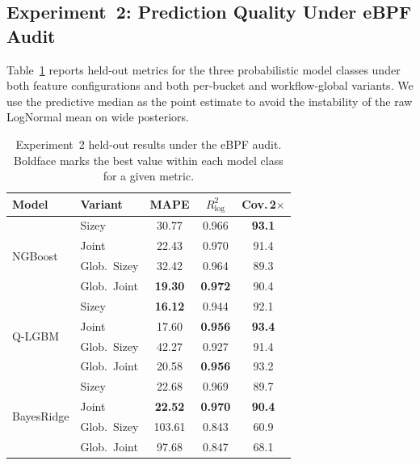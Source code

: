 \subsection{Experiment~2: Prediction Quality Under eBPF Audit}
\label{sec:exp2}

Table~\ref{tab:exp2-final} reports held-out metrics for the
three probabilistic model classes under both feature
configurations and both per-bucket and workflow-global
variants. We use the predictive median as the point estimate
to avoid the instability of the raw LogNormal mean on wide
posteriors.

\begin{table}[t]
\centering
\caption{Experiment~2 held-out results under the eBPF audit.
Boldface marks the best value within each model class for a
given metric.}
\small
\label{tab:exp2-final}
\footnotesize
\setlength{\tabcolsep}{3pt}
\renewcommand{\arraystretch}{1.12}
\begin{tabular}{|l|l|c|c|c|}
\hline
\textbf{Model} & \textbf{Variant} & \textbf{MAPE} & \textbf{$R^2_{\log}$} & \textbf{Cov.\,2$\times$} \\
\hline
\multirow{4}{*}{NGBoost}
  & Sizey               & 30.77            & 0.966            & \textbf{93.1} \\
\cline{2-5}
  & Joint               & 22.43            & 0.970            & 91.4 \\
\cline{2-5}
  & Glob.\ Sizey        & 32.42            & 0.964            & 89.3 \\
\cline{2-5}
  & Glob.\ Joint        & \textbf{19.30}   & \textbf{0.972}   & 90.4 \\
\hline
\multirow{4}{*}{Q-LGBM}
  & Sizey               & \textbf{16.12}   & 0.944            & 92.1 \\
\cline{2-5}
  & Joint               & 17.60            & \textbf{0.956}   & \textbf{93.4} \\
\cline{2-5}
  & Glob.\ Sizey        & 42.27            & 0.927            & 91.4 \\
\cline{2-5}
  & Glob.\ Joint        & 20.58            & \textbf{0.956}   & 93.2 \\
\hline
\multirow{4}{*}{BayesRidge}
  & Sizey               & 22.68            & 0.969            & 89.7 \\
\cline{2-5}
  & Joint               & \textbf{22.52}   & \textbf{0.970}   & \textbf{90.4} \\
\cline{2-5}
  & Glob.\ Sizey        & 103.61           & 0.843            & 60.9 \\
\cline{2-5}
  & Glob.\ Joint        & 97.68            & 0.847            & 68.1 \\
\hline
\end{tabular}
\end{table}

